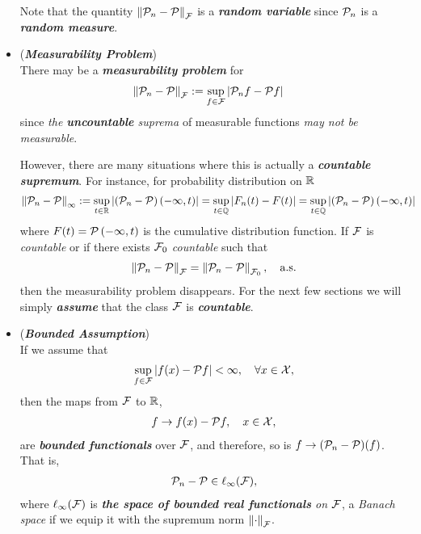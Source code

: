 \documentclass[11pt]{article}
\begin{document}
\begin{itemize}
\begin{remark}
Note that the quantity $\left\|{\mathcal P}_n  - {\mathcal P}\right\|_{{\mathcal F}}$ is a \emph{\textbf{random variable}} since ${\mathcal P}_n$ is a \emph{\textbf{random measure}}.
\end{remark}

\item \begin{remark} (\textbf{\emph{Measurability Problem}})\\
There may be a \emph{\textbf{measurability problem}} for 
\begin{align*}
\left\|{\mathcal P}_n  - {\mathcal P}\right\|_{{\mathcal F}} &:= \sup_{f \in {\mathcal F}}\left\lvert {\mathcal P}_n f - {\mathcal P} f \right\rvert
\end{align*}  since \emph{the \textbf{uncountable} suprema} of measurable functions \emph{may not be measurable}. 

However, there are many situations where this is actually a \emph{\textbf{countable supremum}}. For instance, for probability distribution on ${\mathbb R}$
\begin{align*}
\left\|{\mathcal P}_n  - {\mathcal P}\right\|_{\infty} &:= \sup_{t \in {\mathbb R}}\left\lvert \left({\mathcal P}_n - {\mathcal P}\right)(-\infty, t) \right\rvert =  \sup_{t \in {\mathbb Q}}\left\lvert F_n(t) - F(t) \right\rvert =  \sup_{t \in {\mathbb Q}}\left\lvert \left({\mathcal P}_n - {\mathcal P}\right)(-\infty, t) \right\rvert
\end{align*} where $F(t) = {\mathcal P}\left(-\infty, t\right)$ is the cumulative distribution function. If ${\mathcal F}$ is \emph{countable} or if there exists ${\mathcal F}_0$ \emph{countable} such that
\begin{align*}
\left\|{\mathcal P}_n  - {\mathcal P}\right\|_{{\mathcal F}}  = \left\|{\mathcal P}_n  - {\mathcal P}\right\|_{{\mathcal F}_0}, \quad \text{a.s.} 
\end{align*} then the measurability problem disappears. For the next few sections we will simply \emph{\textbf{assume}} that the class ${\mathcal F}$ is \emph{\textbf{countable}}.
\end{remark}

\item \begin{remark} (\textbf{\emph{Bounded Assumption}})\\
If we assume that
\begin{align}
\sup_{f \in {\mathcal F}}\left\lvert f(x) - {\mathcal P} f \right\rvert < \infty, \quad \forall x \in {\mathcal X}, \label{def: empirical_process_bounded}
\end{align}
then the maps from ${\mathcal F}$ to ${\mathbb R}$,
\begin{align*}
f \rightarrow f(x) - {\mathcal P} f, \quad x\in {\mathcal X},
\end{align*} are \emph{\textbf{bounded functionals}} over ${\mathcal F}$, and therefore, so is $f \to  ({\mathcal P}_n - {\mathcal P})(f)$. That is,
\begin{align*}
{\mathcal P}_n - {\mathcal P} \in \ell_{\infty}({\mathcal F}),
\end{align*}
where  $\ell_{\infty}({\mathcal F})$ is \emph{\textbf{the space of bounded real functionals} on ${\mathcal F}$}, a \emph{Banach space} if we equip it with the supremum norm $\left\|\cdot\right\|_{{\mathcal F}}$. 


\end{remark}
\end{itemize}
\end{document}
